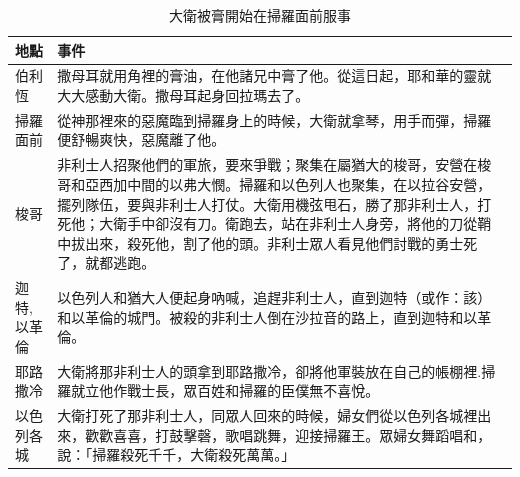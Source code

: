 \documentclass{ctexart}
\begin{document}
\begin{table}[!hbp]
\centering 
\begin{tabular}{|p{2cm}|p{16cm}|}
\hline
\hline
地點 & 事件\\\hline\hline
伯利恆 &撒母耳就用角裡的膏油，在他諸兄中膏了他。從這日起，耶和華的靈就大大感動大衛。撒母耳起身回拉瑪去了。  \\\hline
掃羅面前&從神那裡來的惡魔臨到掃羅身上的時候，大衛就拿琴，用手而彈，掃羅便舒暢爽快，惡魔離了他。 \\\hline
梭哥& 非利士人招聚他們的軍旅，要來爭戰；聚集在屬猶大的梭哥，安營在梭哥和亞西加中間的以弗大憫。掃羅和以色列人也聚集，在以拉谷安營，擺列隊伍，要與非利士人打仗。大衛用機弦甩石，勝了那非利士人，打死他；大衛手中卻沒有刀。衛跑去，站在非利士人身旁，將他的刀從鞘中拔出來，殺死他，割了他的頭。非利士眾人看見他們討戰的勇士死了，就都逃跑。 \\\hline
迦特,以革倫&以色列人和猶大人便起身吶喊，追趕非利士人，直到迦特（或作：該）和以革倫的城門。被殺的非利士人倒在沙拉音的路上，直到迦特和以革倫。 \\\hline
耶路撒冷&大衛將那非利士人的頭拿到耶路撒冷，卻將他軍裝放在自己的帳棚裡.掃羅就立他作戰士長，眾百姓和掃羅的臣僕無不喜悅。\\\hline
以色列各城&大衛打死了那非利士人，同眾人回來的時候，婦女們從以色列各城裡出來，歡歡喜喜，打鼓擊磬，歌唱跳舞，迎接掃羅王。眾婦女舞蹈唱和，說：「掃羅殺死千千，大衛殺死萬萬。」\\\hline
\end{tabular}
\caption{大衛被膏開始在掃羅面前服事}
\end{table}
\end{document}
